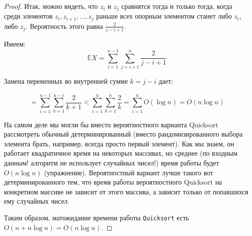 \begin{proof}
    Итак, можно видеть, что $z_i$ и $z_j$ сравнятся тогда и только тогда, когда среди элементов $z_i, z_{i+1}, \ldots, z_j$ раньше всех опорным элементом станет либо $z_i$, либо $z_j$. Вероятность этого равна $\frac{2}{j-i+1}$.

    Имеем: $$\mathbb E X = \sum_{i=1}^{n-1} \sum_{j=i+1}^n \frac{2}{j-i+1}$$

    Замена переменных во внутренней сумме $k = j-i$ дает:

    $$ = \sum_{i=1}^{n-1} \sum_{k=1}^{n-i} \frac{2}{k+1} < \sum_{i=1}^n \sum_{k=1}^n \frac{2}{k} = \sum_{i=1}^n O(\log n) = O(n \log n)$$

	На самом деле мы могли бы вместо вероятностного варианта Quicksort рассмотреть обычный детерминированный (вместо рандомизированного выбора элемента брать, например, всегда просто первый элемент). Как мы знаем, он работает квадратичное время на некоторых массивах, но среднее (по входным данным! алгоритм не использует случайных чисел!) время работы будет $O(n\log n)$ (упражнение). Вероятностный вариант лучше такого вот детерминированного тем, что время работы вероятностного Quicksort на конкретном массиве не зависит от этого массива, а зависит только от попавшихся ему случайных чисел.

    Таким образом, матожидание времени работы \texttt{Quicksort} есть $O(n+n\log n) = O(n\log n)$.
\end{proof}
